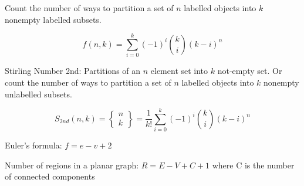 Count the number of ways to partition a set of $n$ labelled objects into $k$ nonempty labelled subsets.

$$f(n, k) = \sum_{i=0}^{k}(-1)^i\binom{k}{i}(k-i)^n$$

Stirling Number 2nd: Partitions of an $n$ element set into $k$ not-empty set. Or count the number of ways to partition a set of $n$ labelled objects into $k$ nonempty unlabelled subsets.

$$S_{2nd}(n, k) = \begin{Bmatrix} n \\ k \end{Bmatrix} = \frac{1}{k!}\sum_{i=0}^{k}(-1)^i\binom{k}{i}(k-i)^n$$

Euler's formula: $f = e - v + 2$

Number of regions in a planar graph: $R = E - V + C + 1$ where C is the number of connected components